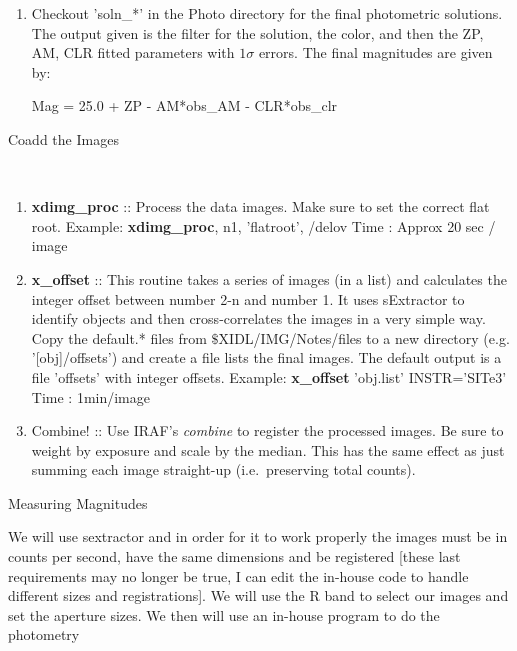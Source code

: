 \documentclass[11pt,letterpaper,dvips]{article}
\begin{document}
\begin{enumerate}
\begin{enumerate}
	  \item Checkout 'soln\_*' in the Photo directory for the final 
		photometric solutions.  The output given is the filter
		for the solution, the color, and then the ZP, AM, CLR fitted
		parameters
		with $1\sigma$ errors.  The final magnitudes are given by:\\
	
	 	\begin{center}
		Mag = 25.0 + ZP - AM*obs\_AM - CLR*obs\_clr \\
		\end{center}

	\end{enumerate}

{\Large  \item Coadd the Images} \\

	\begin{enumerate}

	  \item {\bf xdimg\_proc} :: Process the data images.  Make sure to set
		the correct flat root.
         	\quad Example: {\bf xdimg\_proc}, n1, 'flatroot', /delov
	        \quad Time   : Approx 20 sec / image  

	  \item {\bf x\_offset} :: This routine takes a series of images (in a list)
		and calculates the integer offset between number 2-n and number 1.
		It uses sExtractor to identify objects and then cross-correlates
		the images in a very simple way.
		Copy the default.* files from $\$$XIDL/IMG/Notes/files to a 
		new directory (e.g. '[obj]/offsets') and create a file lists the
		final images. The default output is a file 'offsets' with
		integer offsets.
         	\quad Example: {\bf x\_offset} 'obj.list' INSTR='SITe3'\\
	        \quad Time   : 1min/image \\

	  \item Combine! :: Use IRAF's {\it combine} to register the processed
		images.  Be sure to weight by exposure and scale by the median.
		This has the same effect as just summing each image straight-up
		(i.e.\ preserving total counts).
	\end{enumerate}

  \item Measuring Magnitudes

	We will use sextractor and in order for it to work properly
	the images must be in counts per second,
	have the same dimensions and be registered [these last requirements
	may no longer be true, I can edit the in-house code to handle
	different sizes and registrations].
	We will use the R band to select our images
	and set the aperture sizes.  We then will use an in-house 
	program to do the photometry
	

\end{enumerate}
\end{document}
